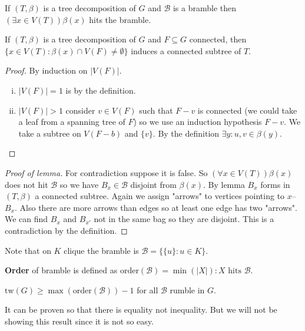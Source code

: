 \begin{lemma}[duality]
	If $(T, \beta)$ is a tree decomposition of $G$ and $\mathcal{B}$ is a bramble then $(\exists x \in V(T)) \beta(x)$ hits the bramble.
\end{lemma}

\begin{observ}
	If $(T, \beta)$ is a tree decomposition of $G$ and $F \subseteq G$ connected, then $\{x \in V(T) : \beta(x) \cap V(F) \neq \emptyset\}$ induces a connected subtree of $T$.
\end{observ}

\begin{proof}
	By induction on $|V(F)|$.
	
	\begin{enumerate}[(i)]
		\item $|V(F)| = 1$ is by the definition.
		\item $|V(F)| > 1$ consider $v \in V(F)$ such that $F - v$ is connected (we could take a leaf from a spanning tree of $F$) so we use an induction hypothesis $F - v$. We take a subtree on $V(F-b)$ and $\{v\}$. By the definition $\exists y: u,v \in \beta(y)$.
	\end{enumerate}
\end{proof}

\begin{proof}[Proof of lemma]
	For contradiction suppose it is false. So $(\forall x \in V(T)) \beta (x)$ does not hit $\mathcal{B}$ so we have $B_{x} \in \mathcal{B}$ disjoint from $\beta(x)$. By lemma $B_{x}$ forms in $(T, \beta)$ a connected subtree. Again we assign "arrows" to vertices pointing to $x$--$B_{x}$. Also there are more arrows than edges so at least one edge has two "arrows". We can find $B_{x}$ and $B_{x'}$ not in the same bag so they are disjoint. This is a contradiction by the definition.
\end{proof}

Note that on $K$ clique the bramble is $\mathcal{B} = \{\{u\}: u \in K\}$.

\begin{defn}
	\textbf{Order} of bramble is defined as $\text{order}(\mathcal{B}) = \min (|X|): X \text{ hits } \mathcal{B}$.
\end{defn} 

\begin{cor}
	$\text{tw}(G) \geq \max (\text{order}(\mathcal{B})) - 1$ for all $\mathcal{B}$ rumble in $G$.
\end{cor}

\begin{rem}
	It can be proven so that there is equality not inequality. But we will not be showing this result since it is not so easy.
\end{rem}

